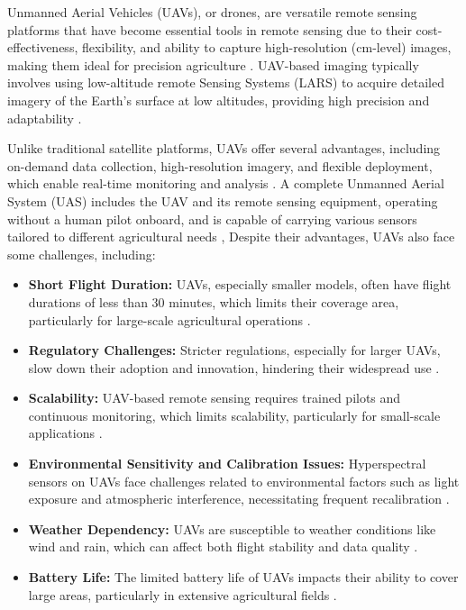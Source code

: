 Unmanned Aerial Vehicles (UAVs), or drones, are versatile remote sensing platforms that have become essential tools in remote sensing due to their cost-effectiveness, flexibility, and ability to capture high-resolution (cm-level) images, making them ideal for precision agriculture \parencite{sishodia2020applications}. UAV-based imaging typically involves using low-altitude remote Sensing Systems (LARS) to acquire detailed imagery of the Earth’s surface at low altitudes, providing high precision and adaptability \parencite{phang2023satellite}.

Unlike traditional satellite platforms, UAVs offer several advantages, including on-demand data collection, high-resolution imagery, and flexible deployment, which enable real-time monitoring and analysis \parencite{phang2023satellite}. A complete Unmanned Aerial System (UAS) includes the UAV and its remote sensing equipment, operating without a human pilot onboard, and is capable of carrying various sensors tailored to different agricultural needs \parencite{adao2017hyperspectral}, Despite their advantages, UAVs also face some challenges, including:

\begin{itemize}
    \item \textbf{Short Flight Duration:} UAVs, especially smaller models, often have flight durations of less than 30 minutes, which limits their coverage area, particularly for large-scale agricultural operations \parencite{phang2023from}.
    
    \item \textbf{Regulatory Challenges:} Stricter regulations, especially for larger UAVs, slow down their adoption and innovation, hindering their widespread use \parencite{phang2023from, delavarpour2021technical}.
    
    \item \textbf{Scalability:} UAV-based remote sensing requires trained pilots and continuous monitoring, which limits scalability, particularly for small-scale applications \parencite{phang2023from}.
    
    \item \textbf{Environmental Sensitivity and Calibration Issues:} Hyperspectral sensors on UAVs face challenges related to environmental factors such as light exposure and atmospheric interference, necessitating frequent recalibration \parencite{adao2017hyperspectral}.
    
    \item \textbf{Weather Dependency:} UAVs are susceptible to weather conditions like wind and rain, which can affect both flight stability and data quality \parencite{delavarpour2021technical}.
    
    \item \textbf{Battery Life:} The limited battery life of UAVs impacts their ability to cover large areas, particularly in extensive agricultural fields \parencite{delavarpour2021technical}.
  \end{itemize}
  
